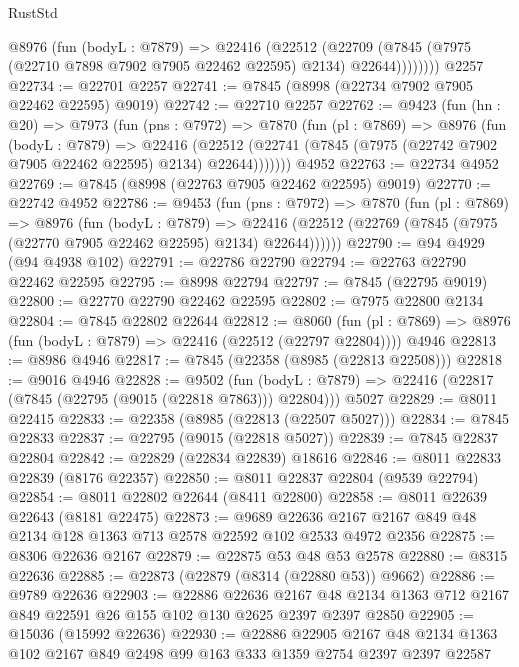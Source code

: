 \begin{lexlean}{RustStd}
\begin{coremodule}
          @8976
            (fun (bodyL : @7879) =>
            @22416
              (@22512
                (@22709 (@7845 (@7975 (@22710 @7898 @7902 @7905 @22462 @22595) @2134) @22644))))))))
    @2257
@22734 := @22701 @2257
@22741 := @7845 (@8998 (@22734 @7902 @7905 @22462 @22595) @9019)
@22742 := @22710 @2257
@22762 := @9423
    (fun (hn : @20) =>
    @7973
      (fun (pns : @7972) =>
      @7870
        (fun (pl : @7869) =>
        @8976
          (fun (bodyL : @7879) =>
          @22416
            (@22512 (@22741 (@7845 (@7975 (@22742 @7902 @7905 @22462 @22595) @2134) @22644)))))))
    @4952
@22763 := @22734 @4952
@22769 := @7845 (@8998 (@22763 @7905 @22462 @22595) @9019)
@22770 := @22742 @4952
@22786 := @9453
    (fun (pns : @7972) =>
    @7870
      (fun (pl : @7869) =>
      @8976
        (fun (bodyL : @7879) =>
        @22416 (@22512 (@22769 (@7845 (@7975 (@22770 @7905 @22462 @22595) @2134) @22644))))))
@22790 := @94 @4929 (@94 @4938 @102)
@22791 := @22786 @22790
@22794 := @22763 @22790 @22462 @22595
@22795 := @8998 @22794
@22797 := @7845 (@22795 @9019)
@22800 := @22770 @22790 @22462 @22595
@22802 := @7975 @22800 @2134
@22804 := @7845 @22802 @22644
@22812 := @8060
    (fun (pl : @7869) => @8976 (fun (bodyL : @7879) => @22416 (@22512 (@22797 @22804))))
    @4946
@22813 := @8986 @4946
@22817 := @7845 (@22358 (@8985 (@22813 @22508)))
@22818 := @9016 @4946
@22828 := @9502
    (fun (bodyL : @7879) => @22416 (@22817 (@7845 (@22795 (@9015 (@22818 @7863))) @22804)))
    @5027
@22829 := @8011 @22415
@22833 := @22358 (@8985 (@22813 (@22507 @5027)))
@22834 := @7845 @22833
@22837 := @22795 (@9015 (@22818 @5027))
@22839 := @7845 @22837 @22804
@22842 := @22829 (@22834 @22839) @18616
@22846 := @8011 @22833 @22839 (@8176 @22357)
@22850 := @8011 @22837 @22804 (@9539 @22794)
@22854 := @8011 @22802 @22644 (@8411 @22800)
@22858 := @8011 @22639 @22643 (@8181 @22475)
@22873 := @9689
    @22636
    @2167
    @2167
    @849
    @48
    @2134
    @128
    @1363
    @713
    @2578
    @22592
    @102
    @2533
    @4972
    @2356
@22875 := @8306 @22636 @2167
@22879 := @22875 @53 @48 @53 @2578
@22880 := @8315 @22636
@22885 := @22873 (@22879 (@8314 (@22880 @53)) @9662)
@22886 := @9789 @22636
@22903 := @22886
    @22636
    @2167
    @48
    @2134
    @1363
    @712
    @2167
    @849
    @22591
    @26
    @155
    @102
    @130
    @2625
    @2397
    @2397
    @2850
@22905 := @15036 (@15992 @22636)
@22930 := @22886
    @22905
    @2167
    @48
    @2134
    @1363
    @102
    @2167
    @849
    @2498
    @99
    @163
    @333
    @1359
    @2754
    @2397
    @2397
    @22587

\end{coremodule}
\end{lexlean}

